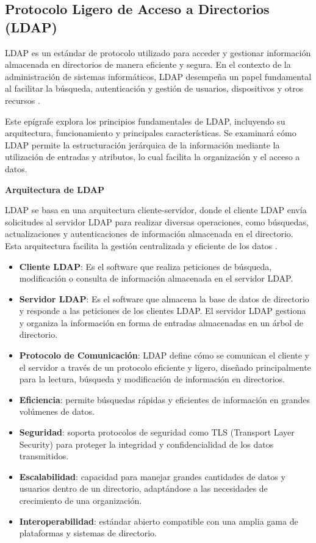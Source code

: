\subsection{Protocolo Ligero de Acceso a Directorios (LDAP)}

LDAP es un estándar de protocolo utilizado para acceder y gestionar información almacenada en directorios de manera eficiente y segura. En el contexto de la administración de sistemas informáticos, LDAP desempeña un papel fundamental al facilitar la búsqueda, autenticación y gestión de usuarios, dispositivos y otros recursos \autocite{sermersheim_lightweight_2006,carter_ldap_2003}.

Este epígrafe explora los principios fundamentales de LDAP, incluyendo su arquitectura, funcionamiento y principales características. Se examinará cómo LDAP permite la estructuración jerárquica de la información mediante la utilización de entradas y atributos, lo cual facilita la organización y el acceso a datos.

\textbf{Arquitectura de LDAP}

LDAP se basa en una arquitectura cliente-servidor, donde el cliente LDAP envía solicitudes al servidor LDAP para realizar diversas operaciones, como búsquedas, actualizaciones y autenticaciones de información almacenada en el directorio. Esta arquitectura facilita la gestión centralizada y eficiente de los datos \autocite{harrison_lightweight_2006,sermersheim_lightweight_2006,carter_ldap_2003}.

\begin{itemize}
    \item \textbf{Cliente LDAP}: Es el software que realiza peticiones de búsqueda, modificación o consulta de información almacenada en el servidor LDAP.
    \item \textbf{Servidor LDAP}: Es el software que almacena la base de datos de directorio y responde a las peticiones de los clientes LDAP. El servidor LDAP gestiona y organiza la información en forma de entradas almacenadas en un árbol de directorio.
    \item \textbf{Protocolo de Comunicación}: LDAP define cómo se comunican el cliente y el servidor a través de un protocolo eficiente y ligero, diseñado principalmente para la lectura, búsqueda y modificación de información en directorios.
    \item \textbf{Eficiencia}: permite búsquedas rápidas y eficientes de información en grandes volúmenes de datos.
    \item \textbf{Seguridad}: soporta protocolos de seguridad como TLS (Transport Layer Security) para proteger la integridad y confidencialidad de los datos transmitidos.
    \item \textbf{Escalabilidad}: capacidad para manejar grandes cantidades de datos y usuarios dentro de un directorio, adaptándose a las necesidades de crecimiento de una organización.
    \item \textbf{Interoperabilidad}: estándar abierto compatible con una amplia gama de plataformas y sistemas de directorio.
\end{itemize}


